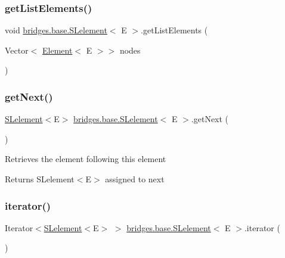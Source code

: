 \subsubsection{\texorpdfstring{getListElements()}{getListElements()}}
{\footnotesize\ttfamily void \mbox{\hyperlink{classbridges_1_1base_1_1_s_lelement}{bridges.\+base.\+S\+Lelement}}$<$ E $>$.get\+List\+Elements (\begin{DoxyParamCaption}\item[{Vector$<$ \mbox{\hyperlink{classbridges_1_1base_1_1_element}{Element}}$<$ E $>$$>$}]{nodes }\end{DoxyParamCaption})\hspace{0.3cm}{\ttfamily [protected]}}

\mbox{\label{classbridges_1_1base_1_1_s_lelement_a060c4671e05e3f20b16630343393b80d}} 
\subsubsection{\texorpdfstring{getNext()}{getNext()}}
{\footnotesize\ttfamily \mbox{\hyperlink{classbridges_1_1base_1_1_s_lelement}{S\+Lelement}}$<$E$>$ \mbox{\hyperlink{classbridges_1_1base_1_1_s_lelement}{bridges.\+base.\+S\+Lelement}}$<$ E $>$.get\+Next (\begin{DoxyParamCaption}{ }\end{DoxyParamCaption})}

Retrieves the element following this element

\begin{DoxyReturn}{Returns}
S\+Lelement$<$\+E$>$ assigned to next 
\end{DoxyReturn}
\mbox{\label{classbridges_1_1base_1_1_s_lelement_a2ecf938707a8009f28dcb98112ede9d9}} 
\subsubsection{\texorpdfstring{iterator()}{iterator()}}
{\footnotesize\ttfamily Iterator$<$\mbox{\hyperlink{classbridges_1_1base_1_1_s_lelement}{S\+Lelement}}$<$E$>$ $>$ \mbox{\hyperlink{classbridges_1_1base_1_1_s_lelement}{bridges.\+base.\+S\+Lelement}}$<$ E $>$.iterator (\begin{DoxyParamCaption}{ }\end{DoxyParamCaption})}


